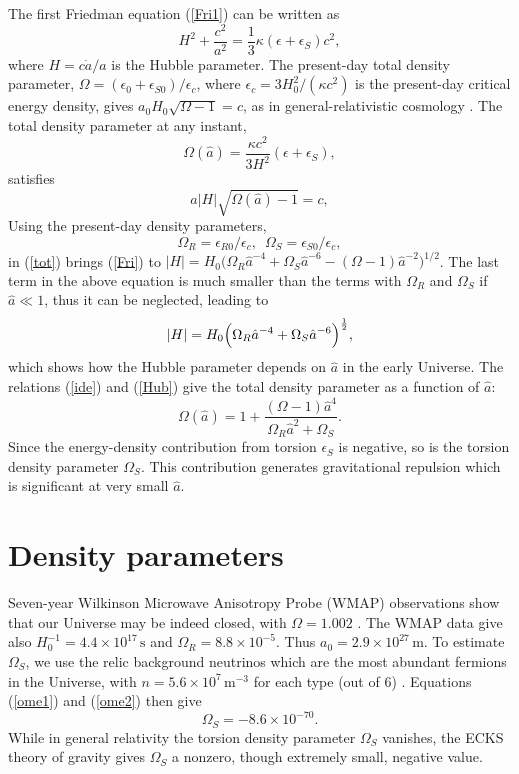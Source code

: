 \documentclass[prd,onecolumn,nofootinbib,showkeys]{revtex4}
\begin{document}
The first Friedman equation (\ref{Fri1}) can be written as
\begin{equation}
H^2+\frac{c^2}{a^2}=\frac{1}{3}\kappa(\epsilon+\epsilon_S)c^2,
\label{Fri}
\end{equation}
where $H=c\dot{a}/a$ is the Hubble parameter.
The present-day total density parameter, $\Omega=(\epsilon_0+\epsilon_{S0})/\epsilon_c$, where $\epsilon_c=3H^2_0/(\kappa c^2)$ is the present-day critical energy density, gives $a_0 H_0\sqrt{\Omega-1}=c$, as in general-relativistic cosmology \cite{Ric}.
The total density parameter at any instant,
\begin{equation}
\Omega(\hat{a})=\frac{\kappa c^2}{3H^2}(\epsilon+\epsilon_S),
\end{equation}
satisfies
\begin{equation}
a|H|\sqrt{\Omega(\hat{a})-1}=c,
\label{ide}
\end{equation}
Using the present-day density parameters,
\begin{equation}
\Omega_R=\epsilon_{R0}/\epsilon_c,\,\,\,\Omega_S=\epsilon_{S0}/\epsilon_c,
\end{equation}
in (\ref{tot}) brings (\ref{Fri}) to $|H|=H_0\bigl(\Omega_R\hat{a}^{-4}+\Omega_S\hat{a}^{-6}-(\Omega-1)\hat{a}^{-2}\bigr)^{1/2}$.
The last term in the above equation is much smaller than the terms with $\Omega_R$ and $\Omega_S$ if $\hat{a}\ll 1$, thus it can be neglected, leading to
\begin{equation}
|H|=H_0\Bigl(\Omega_R\hat{a}^{-4}+\Omega_S\hat{a}^{-6}\Bigr)^{\frac{1}{2}},
\label{Hub}
\end{equation}
which shows how the Hubble parameter depends on $\hat{a}$ in the early Universe.
The relations (\ref{ide}) and (\ref{Hub}) give the total density parameter as a function of $\hat{a}$:
\begin{equation}
\Omega(\hat{a})=1+\frac{(\Omega-1)\hat{a}^4}{\Omega_R\hat{a}^2+\Omega_S}.
\label{omega}
\end{equation}
Since the energy-density contribution from torsion $\epsilon_S$ is negative, so is the torsion density parameter $\Omega_S$.
This contribution generates gravitational repulsion which is significant at very small $\hat{a}$.

\section{Density parameters}
Seven-year Wilkinson Microwave Anisotropy Probe (WMAP) observations show that our Universe may be indeed closed, with $\Omega=1.002$ \cite{WMAP}.
The WMAP data give also $H^{-1}_0=4.4\times10^{17}\,\mbox{s}$ and $\Omega_R=8.8\times10^{-5}$.
Thus $a_0=2.9\times10^{27}\,\mbox{m}$.
To estimate $\Omega_S$, we use the relic background neutrinos which are the most abundant fermions in the Universe, with $n=5.6\times10^7\,\mbox{m}^{-3}$ for each type (out of 6) \cite{Ric}.
Equations (\ref{ome1}) and (\ref{ome2}) then give
\begin{equation}
\Omega_S=-8.6\times10^{-70}.
\label{omegas}
\end{equation}
While in general relativity the torsion density parameter $\Omega_S$ vanishes, the ECKS theory of gravity gives $\Omega_S$ a nonzero, though extremely small, negative value.
\end{document}
